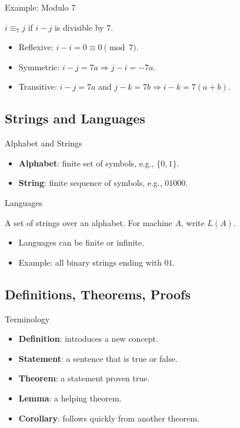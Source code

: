 \documentclass[aspectratio=169]{beamer}
\begin{document}
\begin{frame}{Example: Modulo 7}
  \begin{example}
    $i \equiv_{7} j$ if $i-j$ is divisible by $7$.
  \end{example}
  \begin{itemize}
    \item Reflexive: $i-i = 0 \equiv 0 \pmod{7}$.
    \item Symmetric: $i-j = 7a \Rightarrow j-i = -7a$.
    \item Transitive: $i-j = 7a$ and $j-k = 7b \Rightarrow i-k = 7(a+b)$.
  \end{itemize}
\end{frame}

\subsection{Strings and Languages}

\begin{frame}{Alphabet and Strings}
  \begin{itemize}
    \item \textbf{Alphabet}: finite set of symbols, e.g., $\{0,1\}$.
    \item \textbf{String}: finite sequence of symbols, e.g., $01000$.
  \end{itemize}
\end{frame}

\begin{frame}{Languages}
  \begin{definition}[Language]
    A set of strings over an alphabet. For machine $A$, write $L(A)$.
  \end{definition}
  \begin{itemize}
    \item Languages can be finite or infinite.
    \item Example: all binary strings ending with $01$.
  \end{itemize}
\end{frame}

\subsection{Definitions, Theorems, Proofs}

\begin{frame}{Terminology}
  \begin{itemize}
    \item \textbf{Definition}: introduces a new concept.
    \item \textbf{Statement}: a sentence that is true or false.
    \item \textbf{Theorem}: a statement proven true.
    \item \textbf{Lemma}: a helping theorem.
    \item \textbf{Corollary}: follows quickly from another theorem.
  \end{itemize}
\end{frame}
\end{document}
